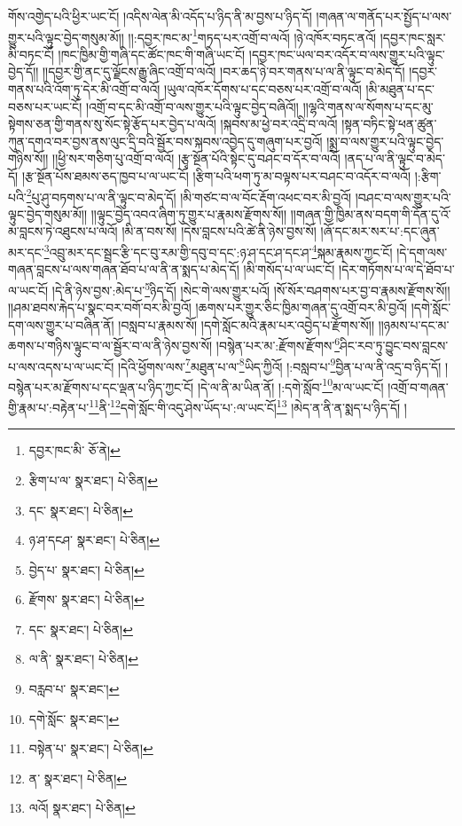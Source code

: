 གོས་འགྱེད་པའི་ཕྱིར་ཡང་ངོ། །འདིས་ལེན་མི་འདོད་པ་ཉིད་ནི་མ་བྱས་པ་ཉིད་དོ། །གཞན་ལ་གནོད་པར་སྤྱོད་པ་ལས་གྱུར་པའི་ལྟུང་བྱེད་གསུམ་མོ།། །།:དབྱར་ཁང་མ་\footnote{དབྱར་ཁང་མི་  ཅོ་ནེ། }གཏད་པར་འགྲོ་བ་ལའོ། །ཉེ་འཁོར་བཏང་ནའོ། །དབྱར་ཁང་སླར་མི་བཏང་ངོ། །ཁང་ཁྱིམ་གྱི་གཞི་དང་ཚོང་ཁང་གི་གཞི་ཡང་ངོ། །དབྱར་ཁང་ཡལ་བར་འདོར་བ་ལས་གྱུར་པའི་ལྟུང་བྱེད་དོ།། །།དབྱར་གྱི་ནང་དུ་ལྗོངས་རྒྱུ་ཞིང་འགྲོ་བ་ལའོ། །བར་ཆད་ཉེ་བར་གནས་པ་ལ་ནི་ལྟུང་བ་མེད་དོ། །དབྱར་གནས་པའི་འོག་ཏུ་དེར་མི་འགྲོ་བ་ལའོ། །ཡུལ་འཁོར་དོགས་པ་དང་བཅས་པར་འགྲོ་བ་ལའོ། །མི་མཐུན་པ་དང་བཅས་པར་ཡང་ངོ། །འགྲོ་བ་དང་མི་འགྲོ་བ་ལས་གྱུར་པའི་ལྟུང་བྱེད་བཞིའོ།། །།ལྷའི་གནས་ལ་སོགས་པ་དང་མུ་སྟེགས་ཅན་གྱི་གནས་སུ་སོང་སྟེ་རྩོད་པར་བྱེད་པ་ལའོ། །སྐབས་མ་ཕྱེ་བར་འདྲི་བ་ལའོ། །སྟན་བཏིང་སྟེ་ཕན་ཚུན་ཀུན་དགའ་བར་བྱས་ནས་ལུང་དྲི་བའི་སྦྱོར་བས་སྐབས་འབྱེད་དུ་གཞུག་པར་བྱའོ། །སྨྲ་བ་ལས་གྱུར་པའི་ལྟུང་བྱེད་གཉིས་སོ།། །།ཕྱི་སར་གཅིག་པུ་འགྲོ་བ་ལའོ། །རྩྭ་སྔོན་པོའི་སྟེང་དུ་བཤང་བ་དོར་བ་ལའོ། །ནད་པ་ལ་ནི་ལྟུང་བ་མེད་དོ། །རྩ་སྔོན་པོས་ཐམས་ཅད་ཁྱབ་པ་ལ་ཡང་ངོ། །རྩིག་པའི་ཕག་ཏུ་མ་བལྟས་པར་བཤང་བ་འདོར་བ་ལའོ། །:རྩིག་པའི་\footnote{རྩིག་པ་ལ་  སྣར་ཐང་།  པེ་ཅིན། }པུ་ཤུ་བཏགས་པ་ལ་ནི་ལྟུང་བ་མེད་དོ། །མི་གཙང་བ་ལ་བོང་རྡོག་འཕང་བར་མི་བྱའོ། །བཤང་བ་ལས་གྱུར་པའི་ལྟུང་བྱེད་གསུམ་མོ།། །།ལྟུང་བྱེད་འབའ་ཞིག་ཏུ་གྱུར་པ་རྣམས་རྫོགས་སོ།། །།གཞན་གྱི་ཁྱིམ་ནས་བདག་གི་དོན་དུ་འོ་མ་བླངས་ཏེ་འཐུངས་པ་ལའོ། །མི་ན་བས་སོ། །དེས་བླངས་པའི་ཚེ་ནི་ཉེས་བྱས་སོ། །ཞོ་དང་མར་སར་པ་:དང་ཞུན་མར་དང་\footnote{དང་  སྣར་ཐང་།  པེ་ཅིན། }འབྲུ་མར་དང་སྦྲང་རྩི་དང་བུ་རམ་གྱི་དབུ་བ་དང་:ཉ་ཤ་དང་ཤ་དང་ཤ་\footnote{ཉ་ཤ་དངཤ་  སྣར་ཐང་།  པེ་ཅིན། }སྐམ་རྣམས་ཀྱང་ངོ། །དེ་དག་ལས་གཞན་བླངས་པ་ལས་གཞན་ཐོབ་པ་ལ་ནི་ན་སྨད་པ་མེད་དོ། །མི་གསོད་པ་ལ་ཡང་ངོ། །དེར་གཏོགས་པ་ལ་དེ་ཐོབ་པ་ལ་ཡང་ངོ། །དེ་ནི་ཉེས་བྱས་:མེད་པ་\footnote{བྱེད་པ་  སྣར་ཐང་།  པེ་ཅིན། }ཉིད་དོ། །སེང་གེ་ལས་གྱུར་པའོ། །སོ་སོར་བཤགས་པར་བྱ་བ་རྣམས་རྫོགས་སོ།། །།ཤམ་ཐབས་རྐེད་པ་སྣང་བར་བགོ་བར་མི་བྱའོ། །ཆགས་པར་གྱུར་ཅིང་ཁྱིམ་གཞན་དུ་འགྲོ་བར་མི་བྱའོ། །དགེ་སློང་དག་ལས་གྱུར་པ་བཞིན་ནོ། །བསླབ་པ་རྣམས་སོ། །དགེ་སློང་མའི་རྣམ་པར་འབྱེད་པ་རྫོགས་སོ།། །།ཉམས་པ་དང་མ་ཆགས་པ་གཉིས་ལྟུང་བ་ལ་སྦྱོར་བ་ལ་ནི་ཉེས་བྱས་སོ། །བསྙེན་པར་མ་:རྫོགས་རྫོགས་\footnote{རྫོགས་  སྣར་ཐང་།  པེ་ཅིན། }ཤིང་རབ་ཏུ་བྱུང་བས་བླངས་པ་ལས་འདས་པ་ལ་ཡང་ངོ། །དེའི་ཕྱོགས་ལས་\footnote{དང་  སྣར་ཐང་།  པེ་ཅིན། }མཐུན་པ་ལ་\footnote{ལ་ནི་  སྣར་ཐང་།  པེ་ཅིན། }ཡིད་ཀྱིའོ། །:བསླབ་པ་\footnote{བརླབ་པ་  སྣར་ཐང་། }བྱིན་པ་ལ་ནི་འདྲ་བ་ཉིད་དོ། །བསྙེན་པར་མ་རྫོགས་པ་དང་ལྡན་པ་ཉིད་ཀྱང་ངོ། །དེ་ལ་ནི་མ་ཡིན་ནོ། །:དགེ་སློབ་\footnote{དགེ་སློང་  སྣར་ཐང་། }མ་ལ་ཡང་ངོ། །འགྲོ་བ་གཞན་གྱི་རྣམ་པ་:བརྟེན་པ་\footnote{བསྟེན་པ་  སྣར་ཐང་།  པེ་ཅིན། }ནི་\footnote{ན་  སྣར་ཐང་།  པེ་ཅིན། }དགེ་སློང་གི་འདུ་ཤེས་ཡོད་པ་:ལ་ཡང་ངོ།\footnote{ལའོ།  སྣར་ཐང་།  པེ་ཅིན། } །མེད་ན་ནི་ན་སྨད་པ་ཉིད་དོ། །
